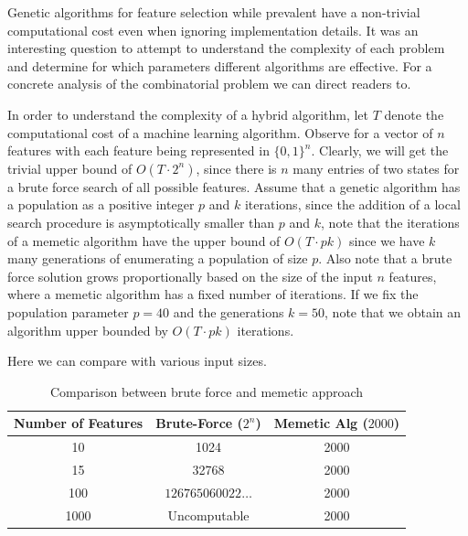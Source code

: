 \documentclass[conference]{IEEEtran}
\begin{document}
Genetic algorithms for feature selection while prevalent have a non-trivial computational cost even when ignoring implementation details. It was an interesting question to attempt to understand the complexity of each problem and determine for which parameters different algorithms are effective. For a concrete analysis of the combinatorial problem we can direct readers to\cite{MathiesonEtAl2017,CottaMoscato2003}.

In order to understand the complexity of a hybrid algorithm, let $T$ denote the computational cost of a machine learning algorithm. Observe for a vector of $n$ features with each feature being represented in $\{0,1\}^{n}$. Clearly, we will get the trivial upper bound of $O(T\cdot 2^{n})$, since there is $n$ many entries of two states for a brute force search of all possible features. Assume that a genetic algorithm has a population as a positive integer $p$ and $k$ iterations, since the addition of a local search procedure is asymptotically smaller than $p$ and $k$, note that the iterations of a memetic algorithm have the upper bound of $O(T\cdot pk)$ since we have $k$ many generations of enumerating a population of size $p$. Also note that a brute force solution grows proportionally based on the size of the input $n$ features, where a memetic algorithm has a fixed number of iterations. If we fix the population parameter $p=40$ and the generations $k=50$, note that we obtain an algorithm upper bounded by $O(T\cdot pk)$ iterations.

Here we can compare with various input sizes.

\begin{table}[h!]
	\begin{center}
		\begin{tabular}{| c c c |}
			\hline
			Number of Features & Brute-Force ($2^{n}$) & Memetic Alg ($2000$) \\ [0.5ex]
			\hline
			10                 & 1024                  & 2000                 \\
			15                 & 32768                 & 2000                 \\
			100                & $126765060022\ldots$  & 2000                 \\
			1000               & Uncomputable          & 2000                 \\
			\hline
		\end{tabular}
	\end{center}
	\caption{Comparison between brute force and memetic approach}
	\label{table:memetic-brute-force}
\end{table}
\end{document}
